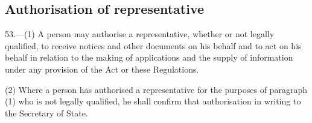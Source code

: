 \documentclass[a4paper,12pt]{article}
\begin{document}
%
%
%

\subsection[53. Authorisation of representative]{Authorisation of representative}

53.—(1) A person may authorise a representative, whether or not legally qualified, to receive notices and other documents on his behalf and to act on his behalf in relation to the making of applications and the supply of information under any provision of the Act or these Regulations.

(2) Where a person has authorised a representative for the purposes of paragraph (1) who is not legally qualified, he shall confirm that authorisation in writing to the Secretary of State.

\end{document}
